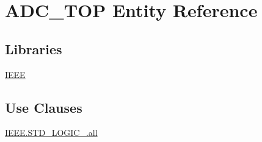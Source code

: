 \hypertarget{class_a_d_c___t_o_p}{\section{A\-D\-C\-\_\-\-T\-O\-P Entity Reference}
\label{class_a_d_c___t_o_p}
}
\subsection*{Libraries}
 \begin{DoxyCompactItemize}
\item 
\hypertarget{class_a_d_c___t_o_p_af8ec17885def4d048684098150681880}{\hyperlink{class_a_d_c___t_o_p_af8ec17885def4d048684098150681880}{I\-E\-E\-E} }\label{class_a_d_c___t_o_p_af8ec17885def4d048684098150681880}

\end{DoxyCompactItemize}
\subsection*{Use Clauses}
 \begin{DoxyCompactItemize}
\item 
\hypertarget{class_a_d_c___t_o_p_ab63724f5341c7a717b04b257a0bb19be}{\hyperlink{class_a_d_c___t_o_p_ab63724f5341c7a717b04b257a0bb19be}{I\-E\-E\-E.\-S\-T\-D\-\_\-\-L\-O\-G\-I\-C\-\_.\-all}   }\label{class_a_d_c___t_o_p_ab63724f5341c7a717b04b257a0bb19be}

\end{DoxyCompactItemize}
